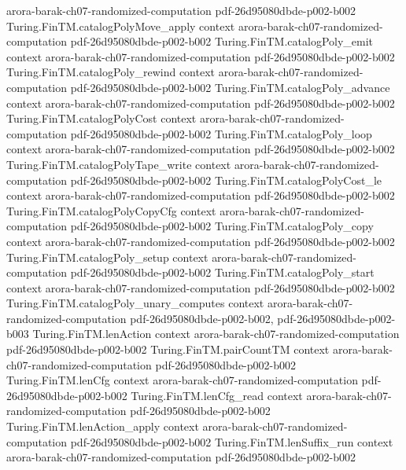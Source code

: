 \begin{theorem}
  {arora-barak-ch07-randomized-computation}
  {pdf-26d95080dbde-p002-b002}
\proofstep
  {Turing.FinTM.catalogPolyMove_apply}
  {context}
  {arora-barak-ch07-randomized-computation}
  {pdf-26d95080dbde-p002-b002}
\proofstep
  {Turing.FinTM.catalogPoly_emit}
  {context}
  {arora-barak-ch07-randomized-computation}
  {pdf-26d95080dbde-p002-b002}
\proofstep
  {Turing.FinTM.catalogPoly_rewind}
  {context}
  {arora-barak-ch07-randomized-computation}
  {pdf-26d95080dbde-p002-b002}
\proofstep
  {Turing.FinTM.catalogPoly_advance}
  {context}
  {arora-barak-ch07-randomized-computation}
  {pdf-26d95080dbde-p002-b002}
\proofstep
  {Turing.FinTM.catalogPolyCost}
  {context}
  {arora-barak-ch07-randomized-computation}
  {pdf-26d95080dbde-p002-b002}
\proofstep
  {Turing.FinTM.catalogPoly_loop}
  {context}
  {arora-barak-ch07-randomized-computation}
  {pdf-26d95080dbde-p002-b002}
\proofstep
  {Turing.FinTM.catalogPolyTape_write}
  {context}
  {arora-barak-ch07-randomized-computation}
  {pdf-26d95080dbde-p002-b002}
\proofstep
  {Turing.FinTM.catalogPolyCost_le}
  {context}
  {arora-barak-ch07-randomized-computation}
  {pdf-26d95080dbde-p002-b002}
\proofstep
  {Turing.FinTM.catalogPolyCopyCfg}
  {context}
  {arora-barak-ch07-randomized-computation}
  {pdf-26d95080dbde-p002-b002}
\proofstep
  {Turing.FinTM.catalogPoly_copy}
  {context}
  {arora-barak-ch07-randomized-computation}
  {pdf-26d95080dbde-p002-b002}
\proofstep
  {Turing.FinTM.catalogPoly_setup}
  {context}
  {arora-barak-ch07-randomized-computation}
  {pdf-26d95080dbde-p002-b002}
\proofstep
  {Turing.FinTM.catalogPoly_start}
  {context}
  {arora-barak-ch07-randomized-computation}
  {pdf-26d95080dbde-p002-b002}
\proofstep
  {Turing.FinTM.catalogPoly_unary_computes}
  {context}
  {arora-barak-ch07-randomized-computation}
  {pdf-26d95080dbde-p002-b002,
    pdf-26d95080dbde-p002-b003}
\proofstep
  {Turing.FinTM.lenAction}
  {context}
  {arora-barak-ch07-randomized-computation}
  {pdf-26d95080dbde-p002-b002}
\proofstep
  {Turing.FinTM.pairCountTM}
  {context}
  {arora-barak-ch07-randomized-computation}
  {pdf-26d95080dbde-p002-b002}
\proofstep
  {Turing.FinTM.lenCfg}
  {context}
  {arora-barak-ch07-randomized-computation}
  {pdf-26d95080dbde-p002-b002}
\proofstep
  {Turing.FinTM.lenCfg_read}
  {context}
  {arora-barak-ch07-randomized-computation}
  {pdf-26d95080dbde-p002-b002}
\proofstep
  {Turing.FinTM.lenAction_apply}
  {context}
  {arora-barak-ch07-randomized-computation}
  {pdf-26d95080dbde-p002-b002}
\proofstep
  {Turing.FinTM.lenSuffix_run}
  {context}
  {arora-barak-ch07-randomized-computation}
  {pdf-26d95080dbde-p002-b002}

\end{theorem}
